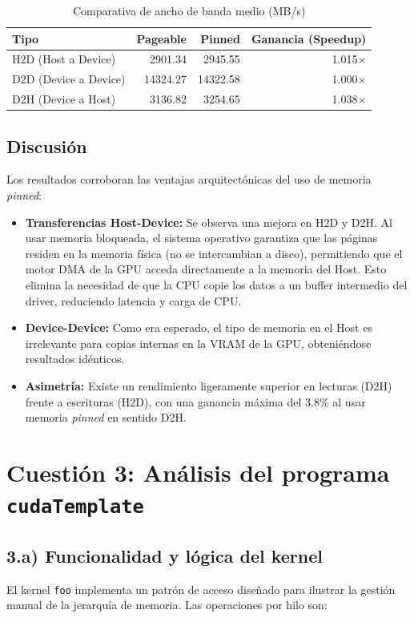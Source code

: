 \documentclass[12pt,a4paper]{report}
\begin{document}
\begin{table}[H]
\centering
\caption{Comparativa de ancho de banda medio (MB/s)}
\label{tab:bandwidth}
\begin{tabular}{l r r r}
    \toprule
    \textbf{Tipo} & \textbf{Pageable} & \textbf{Pinned} & \textbf{Ganancia (Speedup)} \\
    \midrule
    H2D (Host a Device) & 2901.34 & 2945.55 & 1.015$\times$ \\
    D2D (Device a Device) & 14324.27 & 14322.58 & 1.000$\times$ \\
    D2H (Device a Host) & 3136.82 & 3254.65 & 1.038$\times$ \\
    \bottomrule
\end{tabular}
\end{table}

\subsection{Discusión}
Los resultados corroboran las ventajas arquitectónicas del uso de memoria \textit{pinned}:
\begin{itemize}
    \item \textbf{Transferencias Host-Device:} Se observa una mejora en H2D y D2H. Al usar memoria bloqueada, el sistema operativo garantiza que las páginas residen en la memoria física (no se intercambian a disco), permitiendo que el motor DMA de la GPU acceda directamente a la memoria del Host. Esto elimina la necesidad de que la CPU copie los datos a un buffer intermedio del driver, reduciendo latencia y carga de CPU.
    \item \textbf{Device-Device:} Como era esperado, el tipo de memoria en el Host es irrelevante para copias internas en la VRAM de la GPU, obteniéndose resultados idénticos.
    \item \textbf{Asimetría:} Existe un rendimiento ligeramente superior en lecturas (D2H) frente a escrituras (H2D), con una ganancia máxima del 3.8\% al usar memoria \textit{pinned} en sentido D2H.
\end{itemize}

\section{Cuestión 3: Análisis del programa \texttt{cudaTemplate}}

\subsection{3.a) Funcionalidad y lógica del kernel}
El kernel \texttt{foo} implementa un patrón de acceso diseñado para ilustrar la gestión manual de la jerarquía de memoria. Las operaciones por hilo son:
\end{document}
